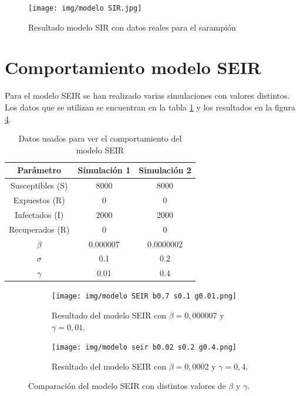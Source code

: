 \begin{figure}[H]
    \centering
    \texttt{[image: img/modelo SIR.jpg]}
    \caption{Resultado modelo SIR con datos reales para el sarampión}
    \label{fig:simusara}
    
\end{figure}







\section{Comportamiento modelo SEIR}
Para el modelo SEIR se han realizado varias simulaciones con valores distintos. Los datos que se utilizan se encuentran en la tabla \ref{tab:datos para modelo SEIR} y los resultados en la figura \ref{fig:comparacion_SEIR}.

\begin{table}[H]
\centering
\begin{tabular}{|c|c|c|}
\hline
\textbf{Parámetro} & \textbf{Simulación 1} & \textbf{Simulación 2}  \\
\hline
Susceptibles (S) & 8000 & 8000 \\
\hline
Expuestos (R)   &  0   & 0   \\
\hline
Infectados (I)   & 2000   & 2000   \\
\hline
Recuperados (R)   &  0   & 0   \\
\hline
\(\beta\)        & 0.000007 & 0.0000002  \\
\hline
\(\sigma\)        & 0.1 & 0.2  \\
\hline
\(\gamma\)        & 0.01 & 0.4\\
\hline
\end{tabular}
\caption{Datos usados para ver el comportamiento del modelo SEIR}
\label{tab:datos para modelo SEIR}
\end{table}





\begin{figure}[H]
    \centering

    \begin{subfigure}[b]{0.9\linewidth}
        \centering
        \texttt{[image: img/modelo SEIR b0.7 s0.1 g0.01.png]}
        \caption{Resultado del modelo SEIR con $\beta = 0{,}000007$ y $\gamma = 0{,}01$.}
        \label{fig:simulacion1_SEIR}
    \end{subfigure}

    \vspace{0.5cm}

    \begin{subfigure}[b]{0.9\linewidth}
        \centering
        \texttt{[image: img/modelo seir b0.02 s0.2 g0.4.png]}
        \caption{Resultado del modelo SEIR con $\beta = 0{,}0002$ y $\gamma = 0{,}4$.}
        \label{fig:simulacion2_SEIR}
    \end{subfigure}

    \caption{Comparación del modelo SEIR con distintos valores de $\beta$ y $\gamma$.}
    \label{fig:comparacion_SEIR}
\end{figure}

